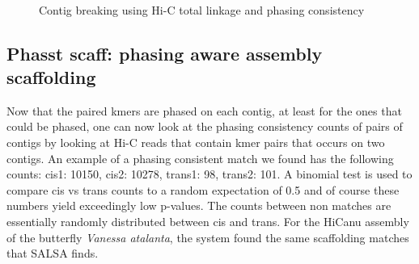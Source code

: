 \begin{figure}[htbp!]
\caption{Contig breaking using Hi-C total linkage and phasing consistency}
\label{figure:contigbreaking}
\begin{centering}
 \\
\end{centering}

\end{figure}


\subsection{Phasst scaff: phasing aware assembly scaffolding}

\par{
Now that the paired kmers are phased on each contig, at least for the ones that could be phased, one can now look at the phasing consistency counts of pairs of contigs by looking at Hi-C reads that contain kmer pairs that occurs on two contigs. An example of a phasing consistent match we found has the following counts:  cis1: 10150, cis2: 10278, trans1: 98, trans2: 101. A binomial test is used to compare cis vs trans counts to a random expectation of 0.5 and of course these numbers yield exceedingly low p-values. The counts between non matches are essentially randomly distributed between cis and trans. For the HiCanu assembly of the butterfly \textit{Vanessa atalanta}, the system found the same scaffolding matches that SALSA finds.
}

